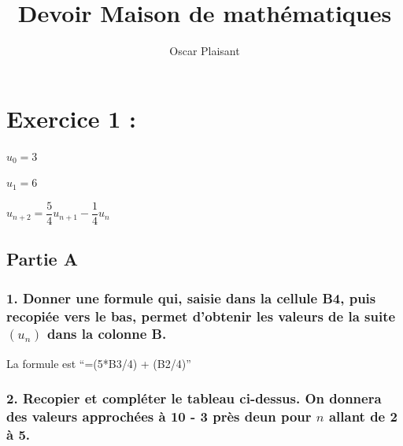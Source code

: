 \documentclass[]{scrartcl}
\title{\huge Devoir Maison de mathématiques}
\author{Oscar Plaisant}
\date{}
\begin{document}
\maketitle

\hypertarget{exercice-1}{%
\section{Exercice 1 :}\label{exercice-1}}

\(u_0 = 3\)

\(u_1 = 6\)

\(u_{n+2} = \dfrac{5}{4}u_{n+1} -\dfrac{1}{4}u_n\)

\hypertarget{partie-a}{%
\subsection{Partie A}\label{partie-a}}

\hypertarget{donner-une-formule-qui-saisie-dans-la-cellule-b4-puis-recopiuxe9e-vers-le-bas-permet-dobtenir-les-valeurs-de-la-suite-u_n-dans-la-colonne-b.}{%
\subsubsection{\texorpdfstring{1. Donner une formule qui, saisie dans la
cellule B4, puis recopiée vers le bas, permet d'obtenir les valeurs de
la suite \((u_n)\) dans la colonne
B.}{1. Donner une formule qui, saisie dans la cellule B4, puis recopiée vers le bas, permet d'obtenir les valeurs de la suite (u\_n) dans la colonne B.}}\label{donner-une-formule-qui-saisie-dans-la-cellule-b4-puis-recopiuxe9e-vers-le-bas-permet-dobtenir-les-valeurs-de-la-suite-u_n-dans-la-colonne-b.}}

La formule est ``=(5*B3/4) + (B2/4)''

\hypertarget{recopier-et-compluxe9ter-le-tableau-ci-dessus.-on-donnera-des-valeurs-approchuxe9es-uxe0-10---3-pruxe8s-deun-pour-n-allant-de-2-uxe0-5.}{%
\subsubsection{\texorpdfstring{2. Recopier et compléter le tableau
ci-dessus. On donnera des valeurs approchées à 10 - 3 près deun pour
\(n\) allant de 2 à
5.}{2. Recopier et compléter le tableau ci-dessus. On donnera des valeurs approchées à 10 - 3 près deun pour n allant de 2 à 5.}}\label{recopier-et-compluxe9ter-le-tableau-ci-dessus.-on-donnera-des-valeurs-approchuxe9es-uxe0-10---3-pruxe8s-deun-pour-n-allant-de-2-uxe0-5.}}
\end{document}
